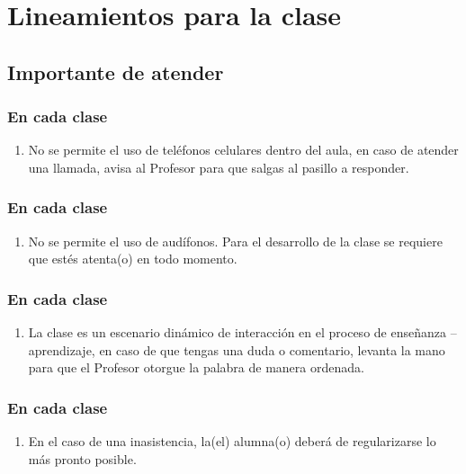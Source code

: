 \documentclass[14pt]{beamer}
\begin{document}
\section{Lineamientos para la clase}
\subsection{Importante de atender}

\begin{frame}
\frametitle{En cada clase}
\begin{enumerate}[<+->]
\item No se permite el uso de teléfonos celulares dentro del aula, en caso de atender una llamada, avisa al Profesor para que salgas al pasillo a responder.
\seti
\end{enumerate}
\end{frame}
\begin{frame}
\frametitle{En cada clase}
\begin{enumerate}[<+->]
\conti
\item No se permite el uso de audífonos. Para el desarrollo de la clase se requiere que estés atenta(o) en todo momento.
\seti
\end{enumerate}
\end{frame}
\begin{frame}
\frametitle{En cada clase}
\begin{enumerate}[<+->]
\conti
\item La clase es un escenario dinámico de interacción en el proceso de enseñanza – aprendizaje, en caso de que tengas una duda o comentario, levanta la mano para que el Profesor otorgue la palabra de manera ordenada.
\seti
\end{enumerate}
\end{frame}
\begin{frame}
\frametitle{En cada clase}
\begin{enumerate}[<+->]
\conti
\item En el caso de una inasistencia, la(el) alumna(o) deberá de regularizarse lo más pronto posible.
\seti
\end{enumerate}
\end{frame}
\end{document}
